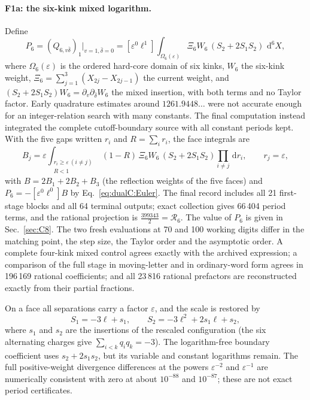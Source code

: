 \documentclass[11pt,a4paper]{article}
\numberwithin{equation}{section}
\newcommand{\dd}{\,\mathrm d}
\newcommand{\db}{\bar\delta}
\begin{document}
\paragraph{F1a: the six-kink mixed logarithm.} Define
\begin{equation}
 P_6=(Q_{6,v\db})_1\big|_{v=1,\db=0}=[\varepsilon^0\ell^1]\int_{\Omega_6(\varepsilon)}\Xi_6W_6\,(S_2+2S_1S_2)\,\dd^6X,
\end{equation}
where $\Omega_6(\varepsilon)$ is the ordered hard-core domain of six kinks, $W_6$ the six-kink weight,
$\Xi_6=\sum_{j=1}^3(X_{2j}-X_{2j-1})$ the current weight, and $(S_2+2S_1S_2)W_6=\partial_v\partial_{\db}W_6$ the
mixed insertion, with both terms and no Taylor factor. Early quadrature estimates around $1261.9448\ldots$ were
not accurate enough for an integer-relation search with many constants. The final computation instead integrated the
complete cutoff-boundary source with all constant periods kept. With the five gaps written $r_i$ and $R=\sum_ir_i$,
the face integrals are
\begin{equation}
 B_j=\varepsilon\int_{\substack{r_i\ge\varepsilon\ (i\ne j)\\ R<1}}(1-R)\,\Xi_6W_6\,(S_2+2S_1S_2)\prod_{i\ne j}\dd r_i,
 \qquad r_j=\varepsilon,
\end{equation}
with $B=2B_1+2B_2+B_3$ (the reflection weights of the five faces) and $P_6=-[\varepsilon^0\ell^0]B$ by
Eq.~\eqref{eq:dualC:Euler}. The final record includes all 21 first-stage blocks and all 64 terminal outputs; exact
collection gives 66\,404 period terms, and the rational projection is $\frac{399343}{2}=\mathcal R_6$. The
value of $P_6$ is given in Sec.~\ref{sec:C8}. The two fresh evaluations at 70 and 100 working digits differ in the
matching point, the step size, the Taylor order and the asymptotic order. A complete four-kink mixed control agrees
exactly with the archived expression; a comparison of the full stage in moving-letter and in ordinary-word form agrees
in 196\,169 rational coefficients; and all 23\,816 rational prefactors are reconstructed exactly from their partial
fractions.

On a face all separations carry a factor $\varepsilon$, and the scale is restored by
\begin{equation}
 S_1=-3\ell+s_1,\qquad S_2=-3\ell^2+2s_1\ell+s_2,
\end{equation}
where $s_1$ and $s_2$ are the insertions of the rescaled configuration (the six alternating charges give
$\sum_{i<k}q_iq_k=-3$). The logarithm-free boundary coefficient uses $s_2+2s_1s_2$, but its variable and constant
logarithms remain. The full positive-weight divergence differences at the powers $\varepsilon^{-2}$ and
$\varepsilon^{-1}$ are numerically consistent with zero at about $10^{-88}$ and $10^{-87}$; these are not exact period
certificates.
\end{document}
